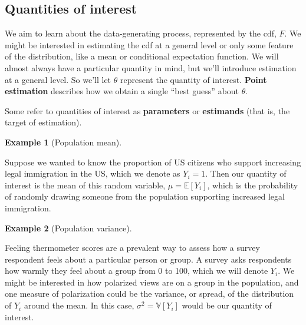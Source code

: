 \documentclass[
  letterpaper,
  DIV=11,
  numbers=noendperiod]{scrreprt}
\newcommand{\E}{\mathbb{E}}
\newcommand{\V}{\mathbb{V}}
\theoremstyle{definition}
\theoremstyle{plain}
\theoremstyle{definition}
\newtheorem{example}{Example}[chapter]
\theoremstyle{remark}
\begin{document}
\hypertarget{quantities-of-interest}{%
\subsection{Quantities of interest}\label{quantities-of-interest}}

We aim to learn about the data-generating process, represented by the
cdf, \(F\). We might be interested in estimating the cdf at a general
level or only some feature of the distribution, like a mean or
conditional expectation function. We will almost always have a
particular quantity in mind, but we'll introduce estimation at a general
level. So we'll let \(\theta\) represent the quantity of interest.
\textbf{Point estimation} describes how we obtain a single ``best
guess'' about \(\theta\).

\begin{tcolorbox}[enhanced jigsaw, title=\textcolor{quarto-callout-note-color}{\faInfo}\hspace{0.5em}{Note}, breakable, titlerule=0mm, opacityback=0, rightrule=.15mm, bottomrule=.15mm, colframe=quarto-callout-note-color-frame, coltitle=black, colbacktitle=quarto-callout-note-color!10!white, bottomtitle=1mm, toptitle=1mm, colback=white, arc=.35mm, opacitybacktitle=0.6, toprule=.15mm, leftrule=.75mm, left=2mm]

Some refer to quantities of interest as \textbf{parameters} or
\textbf{estimands} (that is, the target of estimation).

\end{tcolorbox}

\leavevmode{}%
\begin{example}[Population mean]\label{exm-prop}

Suppose we wanted to know the proportion of US citizens who support
increasing legal immigration in the US, which we denote as \(Y_i = 1\).
Then our quantity of interest is the mean of this random variable,
\(\mu = \E[Y_i]\), which is the probability of randomly drawing someone
from the population supporting increased legal immigration.

\end{example}

\leavevmode{}%
\begin{example}[Population variance]\label{exm-var}

Feeling thermometer scores are a prevalent way to assess how a survey
respondent feels about a particular person or group. A survey asks
respondents how warmly they feel about a group from 0 to 100, which we
will denote \(Y_i\). We might be interested in how polarized views are
on a group in the population, and one measure of polarization could be
the variance, or spread, of the distribution of \(Y_i\) around the mean.
In this case, \(\sigma^2 = \V[Y_i]\) would be our quantity of interest.

\end{example}
\end{document}
